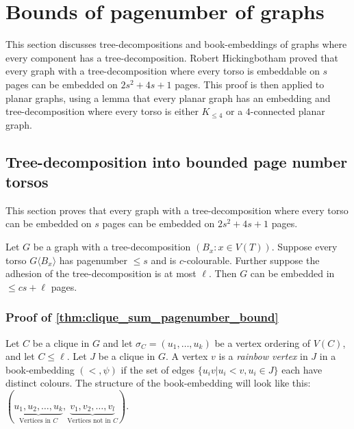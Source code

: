 \section{Bounds of pagenumber of graphs}\label{sec:BoundedPagenumber}
This section discusses tree-decompositions and book-embeddings of graphs where every component has a tree-decomposition. Robert Hickingbotham proved that every graph with a tree-decomposition where every torso is embeddable on $s$ pages can be embedded on $2s^2 + 4s + 1$ pages. This proof is then applied to planar graphs, using a lemma that every planar graph has an embedding and tree-decomposition where every torso is either $K_{\leq 4}$ or a $4$-connected planar graph. 

\subsection{Tree-decomposition into bounded page number torsos}\label{ssec:Clique_sum_Pagenumber_bound}

This section proves that every graph with a tree-decomposition where every torso can be embedded on $s$ pages can be embedded on $2s^2 + 4s + 1$ pages. 

\begin{theorem}\label{thm:clique_sum_pagenumber_bound}
	Let \(G\) be a graph with a tree-decomposition \((B_x: x \in V(T))\). Suppose every torso \(G \langle B_x \rangle\) has pagenumber \(\leq s\) and is \(c\)-colourable. Further suppose the adhesion of the tree-decomposition is at most \(\ell\).
	Then $G$ can be embedded in \(\leq cs + \ell \) pages.
\end{theorem}

\subsubsection{Proof of \cref{thm:clique_sum_pagenumber_bound}}

Let \(C\) be a clique in \(G\) and let \(\sigma_C = (u_1, \ldots , u_k)\) be a vertex ordering of \(V(C)\), and let \(C \leq \ell \). Let $J$ be a clique in $G$. A vertex $v$ is a \textit{rainbow vertex} in $J$ in a book-embedding $(<, \psi)$ if the set of edges $\{u_i v | u_i < v, u_i \in J\}$ each have distinct colours. The structure of the book-embedding will look like this: \((\underbrace{u_1, u_2, \ldots, u_k}_{\text{Vertices in } C}, \underbrace{v_1, v_2, \ldots, v_l}_{\text{Vertices not in }C})\).

